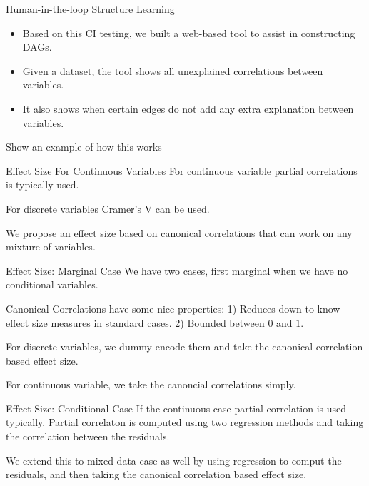 \documentclass{beamer}
\begin{document}
\begin{frame}{Human-in-the-loop Structure Learning}
	\begin{itemize}
		\item Based on this CI testing, we built a web-based tool to assist in constructing DAGs.
		\item Given a dataset, the tool shows all unexplained correlations between variables.
		\item It also shows when certain edges do not add any extra explanation between variables.
	\end{itemize}
\end{frame}

\begin{frame}{Show an example of how this works}
\end{frame}

\begin{frame}{Effect Size For Continuous Variables}
	For continuous variable partial correlations is typically used.

	For discrete variables Cramer's V can be used.

	We propose an effect size based on canonical correlations that can work on any mixture of variables.
\end{frame}

\begin{frame}{Effect Size: Marginal Case}
	We have two cases, first marginal when we have no conditional variables.

	Canonical Correlations have some nice properties: 1) Reduces down to know effect size measures in standard cases. 2) Bounded between $ 0 $ and $ 1 $.

	For discrete variables, we dummy encode them and take the canonical correlation based effect size.

	For continuous variable, we take the canoncial correlations simply.
\end{frame}

\begin{frame}{Effect Size: Conditional Case}
	If the continuous case partial correlation is used typically. Partial correlaton is computed using two regression methods and taking the correlation between the residuals.

	We extend this to mixed data case as well by using regression to comput the residuals, and then taking the canonical correlation based effect size.
\end{frame}
\end{document}

